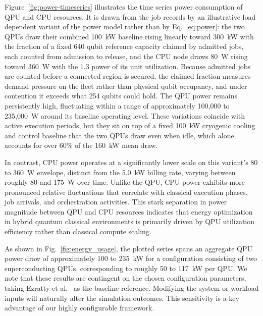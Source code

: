 Figure~\ref{fig:power-timeseries} illustrates the time series power consumption of QPU and CPU resources. It is drawn from the job records by an illustrative load dependent variant of the power model rather than by Eq.~\eqref{eq:power}: the two QPUs draw their combined 100~kW baseline rising linearly toward 300~kW with the fraction of a fixed 640 qubit reference capacity claimed by admitted jobs, each counted from admission to release, and the CPU node draws 80~W rising toward 360~W with the 1.3 power of its unit utilization. Because admitted jobs are counted before a connected region is secured, the claimed fraction measures demand pressure on the fleet rather than physical qubit occupancy, and under contention it exceeds what 254 qubits could hold. The QPU power remains persistently high, fluctuating within a range of approximately 100{,}000 to 235{,}000~W around its baseline operating level. These variations coincide with active execution periods, but they sit on top of a fixed 100~kW cryogenic cooling and control baseline that the two QPUs draw even when idle, which alone accounts for over 60\% of the 160~kW mean draw.

In contrast, CPU power operates at a significantly lower scale on this variant's 80 to 360~W envelope, distinct from the 5.0~kW billing rate, varying between roughly 80 and 175~W over time. Unlike the QPU, CPU power exhibits more pronounced relative fluctuations that correlate with classical execution phases, job arrivals, and orchestration activities. This stark separation in power magnitude between QPU and CPU resources indicates that energy optimization in hybrid quantum classical environments is primarily driven by QPU utilization efficiency rather than classical compute scaling.

As shown in Fig.~\ref{fig:energy_usage}, the plotted series spans an aggregate QPU power draw of approximately 100 to 235~kW for a configuration consisting of two superconducting QPUs, corresponding to roughly 50 to 117~kW per QPU. We note that these results are contingent on the chosen configuration parameters, taking Ezratty et al.~\cite{ezratty2021} as the baseline reference. Modifying the system or workload inputs will naturally alter the simulation outcomes. This sensitivity is a key advantage of our highly configurable framework.
